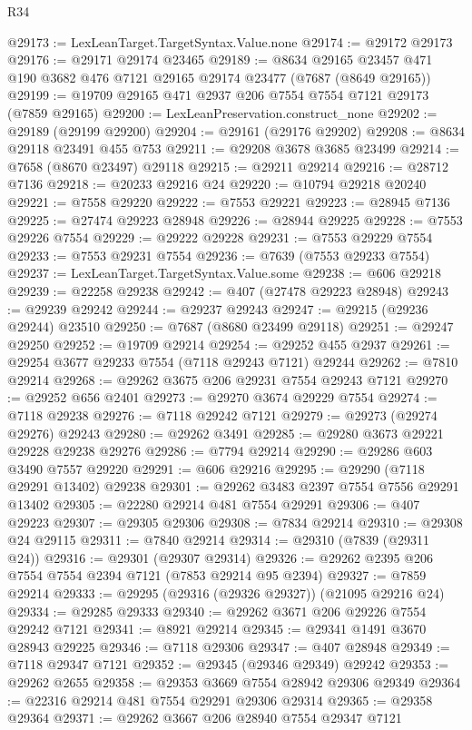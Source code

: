 \begin{lexlean}{R34}
\begin{coremodule}
@29173 := LexLeanTarget.TargetSyntax.Value.none
@29174 := @29172 @29173
@29176 := @29171 @29174 @23465
@29189 := @8634 @29165 @23457 @471 @190 @3682 @476 @7121 @29165 @29174 @23477 (@7687 (@8649 @29165))
@29199 := @19709 @29165 @471 @2937 @206 @7554 @7554 @7121 @29173 (@7859 @29165)
@29200 := LexLeanPreservation.construct_none
@29202 := @29189 (@29199 @29200)
@29204 := @29161 (@29176 @29202)
@29208 := @8634 @29118 @23491 @455 @753
@29211 := @29208 @3678 @3685 @23499
@29214 := @7658 (@8670 @23497) @29118
@29215 := @29211 @29214
@29216 := @28712 @7136
@29218 := @20233 @29216 @24
@29220 := @10794 @29218 @20240
@29221 := @7558 @29220
@29222 := @7553 @29221
@29223 := @28945 @7136
@29225 := @27474 @29223 @28948
@29226 := @28944 @29225
@29228 := @7553 @29226 @7554
@29229 := @29222 @29228
@29231 := @7553 @29229 @7554
@29233 := @7553 @29231 @7554
@29236 := @7639 (@7553 @29233 @7554)
@29237 := LexLeanTarget.TargetSyntax.Value.some
@29238 := @606 @29218
@29239 := @22258 @29238
@29242 := @407 (@27478 @29223 @28948)
@29243 := @29239 @29242
@29244 := @29237 @29243
@29247 := @29215 (@29236 @29244) @23510
@29250 := @7687 (@8680 @23499 @29118)
@29251 := @29247 @29250
@29252 := @19709 @29214
@29254 := @29252 @455 @2937
@29261 := @29254 @3677 @29233 @7554 (@7118 @29243 @7121) @29244
@29262 := @7810 @29214
@29268 := @29262 @3675 @206 @29231 @7554 @29243 @7121
@29270 := @29252 @656 @2401
@29273 := @29270 @3674 @29229 @7554
@29274 := @7118 @29238
@29276 := @7118 @29242 @7121
@29279 := @29273 (@29274 @29276) @29243
@29280 := @29262 @3491
@29285 := @29280 @3673 @29221 @29228 @29238 @29276
@29286 := @7794 @29214
@29290 := @29286 @603 @3490 @7557 @29220
@29291 := @606 @29216
@29295 := @29290 (@7118 @29291 @13402) @29238
@29301 := @29262 @3483 @2397 @7554 @7556 @29291 @13402
@29305 := @22280 @29214 @481 @7554 @29291
@29306 := @407 @29223
@29307 := @29305 @29306
@29308 := @7834 @29214
@29310 := @29308 @24 @29115
@29311 := @7840 @29214
@29314 := @29310 (@7839 (@29311 @24))
@29316 := @29301 (@29307 @29314)
@29326 := @29262 @2395 @206 @7554 @7554 @2394 @7121 (@7853 @29214 @95 @2394)
@29327 := @7859 @29214
@29333 := @29295 (@29316 (@29326 @29327)) (@21095 @29216 @24)
@29334 := @29285 @29333
@29340 := @29262 @3671 @206 @29226 @7554 @29242 @7121
@29341 := @8921 @29214
@29345 := @29341 @1491 @3670 @28943 @29225
@29346 := @7118 @29306
@29347 := @407 @28948
@29349 := @7118 @29347 @7121
@29352 := @29345 (@29346 @29349) @29242
@29353 := @29262 @2655
@29358 := @29353 @3669 @7554 @28942 @29306 @29349
@29364 := @22316 @29214 @481 @7554 @29291 @29306 @29314
@29365 := @29358 @29364
@29371 := @29262 @3667 @206 @28940 @7554 @29347 @7121

\end{coremodule}
\end{lexlean}
